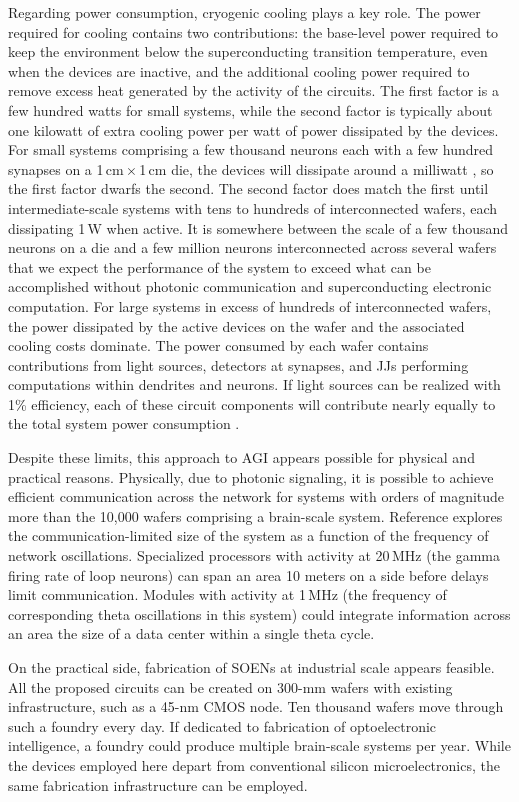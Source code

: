 \documentclass[twocolumn]{article}
\newcommand{\onlinecite}[1]{\hspace{-1 ex} \nocite{#1}\citenum{#1}}
\begin{document}
Regarding power consumption, cryogenic cooling plays a key role. The power required for cooling  contains two contributions: the base-level power required to keep the environment below the superconducting transition temperature, even when the devices are inactive, and the additional cooling power required to remove excess heat generated by the activity of the circuits. The first factor is a few hundred watts for small systems, while the second factor is typically about one kilowatt of extra cooling power per watt of power dissipated by the devices. For small systems comprising a few thousand neurons each with a few hundred synapses on a 1\,cm\,$\times$\,1\,cm die, the devices will dissipate around a milliwatt \cite{sh2019}, so the first factor dwarfs the second. The second factor does match the first until intermediate-scale systems with tens to hundreds of interconnected wafers, each dissipating 1\,W when active. It is somewhere between the scale of a few thousand neurons on a die and a few million neurons interconnected across several wafers that we expect the performance of the system to exceed what can be accomplished without photonic communication and superconducting electronic computation. For large systems in excess of hundreds of interconnected wafers, the power dissipated by the active devices on the wafer and the associated cooling costs dominate. The power consumed by each wafer contains contributions from light sources, detectors at synapses, and JJs performing computations within dendrites and neurons. If light sources can be realized with 1\% efficiency, each of these circuit components will contribute nearly equally to the total system power consumption \cite{sh2020}.

Despite these limits, this approach to AGI appears possible for physical and practical reasons. Physically, due to photonic signaling, it is possible to achieve efficient communication across the network for systems with orders of magnitude more than the 10,000 wafers comprising a brain-scale system. Reference \onlinecite{sh2019} explores the communication-limited size of the system as a function of the frequency of network oscillations. Specialized processors with activity at 20\,MHz (the gamma firing rate of loop neurons) can span an area 10 meters on a side before delays limit communication. Modules with activity at 1\,MHz (the frequency of corresponding theta oscillations in this system) could integrate information across an area the size of a data center within a single theta cycle.

On the practical side, fabrication of SOENs at industrial scale appears feasible. All the proposed circuits can be created on 300-mm wafers with existing infrastructure, such as a 45-nm CMOS node. Ten thousand wafers move through such a foundry every day. If dedicated to fabrication of optoelectronic intelligence, a foundry could produce multiple brain-scale systems per year. While the devices employed here depart from conventional silicon microelectronics, the same fabrication infrastructure can be employed.
\end{document}
